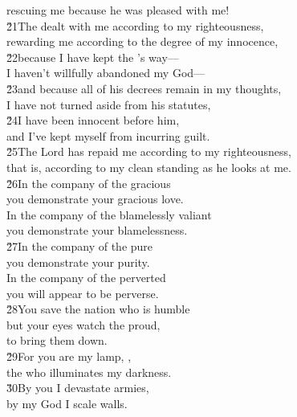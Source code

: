 \begin{poetry}
\poemll    rescuing me because he was pleased with me! \\
\poeml \v{21}The  dealt with me according to my righteousness, \\
\poemll    rewarding me according to the degree of my innocence, \\
\poeml \v{22}because I have kept the 's way--- \\
\poemll    I haven't willfully abandoned my God--- \\
\poeml \v{23}and because all of his decrees remain in my thoughts, \\
\poemll    I have not turned aside from his statutes, \\
\poeml \v{24}I have been innocent before him, \\
\poemll    and I've kept myself from incurring guilt. \\
\poeml \v{25}The Lord has repaid me according to my righteousness, \\
\poemll    that is, according to my clean standing as he looks at me. \\
\poeml \v{26}In the company of the gracious \\
\poemll    you demonstrate your gracious love. \\
\poeml In the company of the blamelessly valiant \\
\poemll    you demonstrate your blamelessness. \\
\poeml \v{27}In the company of the pure \\
\poemll    you demonstrate your purity. \\
\poeml In the company of the perverted \\
\poemll    you will appear to be perverse. \\
\poeml \v{28}You save the nation who is humble \\
\poemll    but your eyes watch the proud, \\
\poemlll       to bring them down. \\
\poeml \v{29}For you are my lamp, , \\
\poemll    the  who illuminates my darkness. \\
\poeml \v{30}By you I devastate armies, \\
\poemll    by my God I scale walls. \\

\end{poetry}
